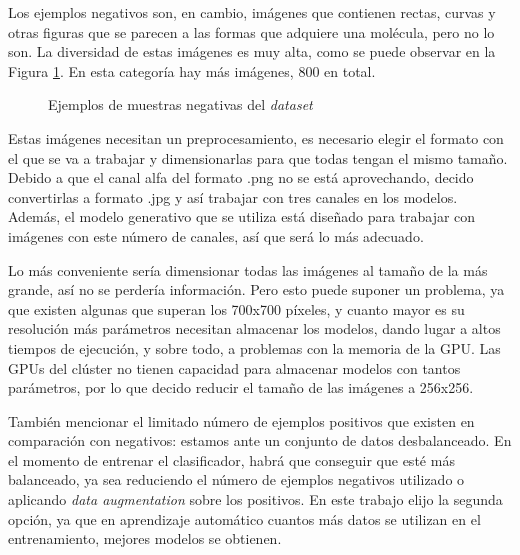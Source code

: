 Los ejemplos negativos son, en cambio, imágenes que contienen rectas, curvas y otras figuras que se parecen a las formas que adquiere una molécula, pero no lo son. La diversidad de estas imágenes es muy alta, como se puede observar en la Figura \ref{fig:negative_examples}. En esta categoría hay más imágenes, 800 en total.

\begin{figure}[H]
\centering
    \caption{Ejemplos de muestras negativas del \textit{dataset}}
    \label{fig:negative_examples}
\end{figure}

Estas imágenes necesitan un preprocesamiento, es necesario elegir el formato con el que se va a trabajar y dimensionarlas para que todas tengan el mismo tamaño. Debido a que el canal alfa del formato .png no se está aprovechando, decido convertirlas a formato .jpg y así trabajar con tres canales en los modelos. Además, el modelo generativo que se utiliza está diseñado para trabajar con imágenes con este número de canales, así que será lo más adecuado.

Lo más conveniente sería dimensionar todas las imágenes al tamaño de la más grande, así no se perdería información. Pero esto puede suponer un problema, ya que existen algunas que superan los 700x700 píxeles, y cuanto mayor es su resolución más parámetros necesitan almacenar los modelos, dando lugar a altos tiempos de ejecución, y sobre todo, a problemas con la memoria de la GPU. Las GPUs del clúster no tienen capacidad para almacenar modelos con tantos parámetros, por lo que decido reducir el tamaño de las imágenes a 256x256. 

También mencionar el limitado número de ejemplos positivos que existen en comparación con negativos: estamos ante un conjunto de datos desbalanceado. En el momento de entrenar el clasificador, habrá que conseguir que esté más balanceado, ya sea reduciendo el número de ejemplos negativos utilizado o aplicando \textit{data augmentation} sobre los positivos. En este trabajo elijo la segunda opción, ya que en aprendizaje automático cuantos más datos se utilizan en el entrenamiento, mejores modelos se obtienen. 

